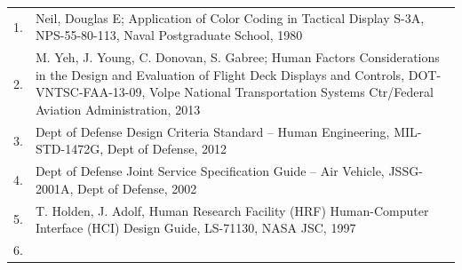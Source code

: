 \documentclass[
]{book}
\begin{document}
\begin{longtable}[]{@{}ll@{}}
\toprule
\endhead
\begin{minipage}[t]{0.01\columnwidth}\raggedright
1.\strut
\end{minipage} & \begin{minipage}[t]{0.93\columnwidth}\raggedright
Neil, Douglas E; Application of Color Coding in Tactical Display S-3A, NPS-55-80-113, Naval Postgraduate School, 1980\strut
\end{minipage}\tabularnewline
\begin{minipage}[t]{0.01\columnwidth}\raggedright
2.\strut
\end{minipage} & \begin{minipage}[t]{0.93\columnwidth}\raggedright
M. Yeh, J. Young, C. Donovan, S. Gabree; Human Factors Considerations in the Design and Evaluation of Flight Deck Displays and Controls, DOT-VNTSC-FAA-13-09, Volpe National Transportation Systems Ctr/Federal Aviation Administration, 2013\strut
\end{minipage}\tabularnewline
\begin{minipage}[t]{0.01\columnwidth}\raggedright
3.\strut
\end{minipage} & \begin{minipage}[t]{0.93\columnwidth}\raggedright
Dept of Defense Design Criteria Standard -- Human Engineering, MIL-STD-1472G, Dept of Defense, 2012\strut
\end{minipage}\tabularnewline
\begin{minipage}[t]{0.01\columnwidth}\raggedright
4.\strut
\end{minipage} & \begin{minipage}[t]{0.93\columnwidth}\raggedright
Dept of Defense Joint Service Specification Guide -- Air Vehicle, JSSG-2001A, Dept of Defense, 2002\strut
\end{minipage}\tabularnewline
\begin{minipage}[t]{0.01\columnwidth}\raggedright
5.\strut
\end{minipage} & \begin{minipage}[t]{0.93\columnwidth}\raggedright
T. Holden, J. Adolf, Human Research Facility (HRF) Human-Computer Interface (HCI) Design Guide, LS-71130, NASA JSC, 1997\strut
\end{minipage}\tabularnewline
\begin{minipage}[t]{0.01\columnwidth}\raggedright
6.\strut
\end{minipage} & \begin{minipage}[t]{0.93\columnwidth}\raggedright

\end{minipage}
\end{longtable}
\end{document}
